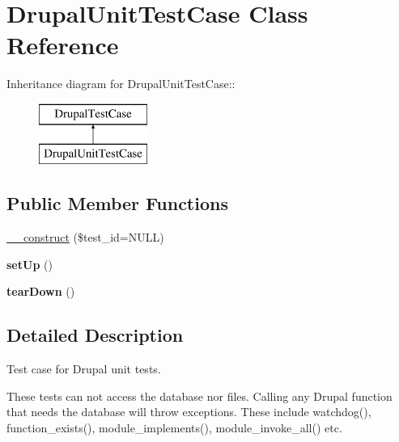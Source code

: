 \hypertarget{class_drupal_unit_test_case}{
\section{DrupalUnitTestCase Class Reference}
\label{class_drupal_unit_test_case}
}
Inheritance diagram for DrupalUnitTestCase::\begin{figure}[H]
\begin{center}
\leavevmode
\includegraphics[height=2cm]{class_drupal_unit_test_case}
\end{center}
\end{figure}
\subsection*{Public Member Functions}
\begin{DoxyCompactItemize}
\item 
\hyperlink{class_drupal_unit_test_case_a90ea280099eab5b03f4584e04c2b38dc}{\_\-\_\-construct} (\$test\_\-id=NULL)
\item 
\hypertarget{class_drupal_unit_test_case_a120dccfa92782522c64da39aaa1d49ab}{
{\bfseries setUp} ()}
\label{class_drupal_unit_test_case_a120dccfa92782522c64da39aaa1d49ab}

\item 
\hypertarget{class_drupal_unit_test_case_a99a2f68e986418daa2e2d461d7d95bf1}{
{\bfseries tearDown} ()}
\label{class_drupal_unit_test_case_a99a2f68e986418daa2e2d461d7d95bf1}

\end{DoxyCompactItemize}


\subsection{Detailed Description}
Test case for Drupal unit tests.

These tests can not access the database nor files. Calling any Drupal function that needs the database will throw exceptions. These include watchdog(), function\_\-exists(), module\_\-implements(), module\_\-invoke\_\-all() etc. 

